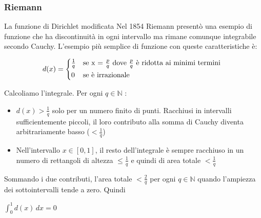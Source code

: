 \begin{frame}[label=Riemann]
  \frametitle{Riemann}
  \begin{block}{La funzione di Dirichlet modificata}    
    Nel 1854 Riemann presentò una esempio di funzione che ha discontinuità in ogni intervallo ma rimane comunque integrabile secondo Cauchy.
    L'esempio più semplice di funzione con queste caratteristiche è:    

    \begin{equation*}
      d(x) =
      \begin{cases*}
        \frac{1}{q} & se x = $\frac{p}{q}$ dove $\frac{p}{q}$ è ridotta ai minimi termini \\
        0 & se è irrazionale
      \end{cases*}
    \end{equation*}

    Calcoliamo l'integrale. Per ogni $q \in \mathbb{N}$ :
    \begin{itemize}
      \item $d(x) > \frac{1}{q}$ solo per un numero finito di punti. Racchiusi in intervalli sufficientemente piccoli, 
      il loro contributo alla somma di Cauchy diventa arbitrariamente basso ($ < \frac{1}{q} $)
      \item Nell'intervallo $x \in [0,1]$, il resto dell'integrale è sempre racchiuso in un numero di rettangoli 
      di altezza $\leq \frac{1}{q}$ e quindi di area totale $< \frac{1}{q}$
    \end{itemize}

    Sommando i due contributi, l'area totale $< \frac{2}{q}$ per ogni $q \in \mathbb{N}$ quando l'ampiezza dei sottointervalli tende a zero. Quindi
    \begin{center}
      $\int_{0}^{1} d(x) \,dx = 0$
    \end{center}
    \end{block}    
\end{frame}

